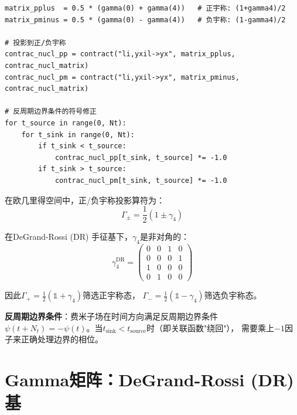 \documentclass[12pt,a4paper]{ctexart}
\begin{document}
\begin{codebox}
\begin{lstlisting}[style=pythonstyle]
matrix_pplus  = 0.5 * (gamma(0) + gamma(4))   # 正宇称: (1+gamma4)/2
matrix_pminus = 0.5 * (gamma(0) - gamma(4))   # 负宇称: (1-gamma4)/2

# 投影到正/负宇称
contrac_nucl_pp = contract("li,yxil->yx", matrix_pplus,  contrac_nucl_matrix)
contrac_nucl_pm = contract("li,yxil->yx", matrix_pminus, contrac_nucl_matrix)

# 反周期边界条件的符号修正
for t_source in range(0, Nt):
    for t_sink in range(0, Nt):
        if t_sink < t_source:
            contrac_nucl_pp[t_sink, t_source] *= -1.0
        if t_sink > t_source:
            contrac_nucl_pm[t_sink, t_source] *= -1.0
\end{lstlisting}
\end{codebox}

\begin{physbox}[宇称投影算符]
在欧几里得空间中，正/负宇称投影算符为：
\begin{equation}
    \Gamma_{\pm} = \frac{1}{2}(1 \pm \gamma_4)
    \label{eq:parity_projector}
\end{equation}

在DeGrand-Rossi (DR) 手征基下，$\gamma_4$是非对角的：
\begin{equation}
    \gamma_4^{\text{DR}} = \begin{pmatrix}
        0 & 0 & 1 & 0 \\
        0 & 0 & 0 & 1 \\
        1 & 0 & 0 & 0 \\
        0 & 1 & 0 & 0
    \end{pmatrix}
\end{equation}

因此$\Gamma_+ = \frac{1}{2}(\mathbb{1} + \gamma_4)$筛选正宇称态，
$\Gamma_- = \frac{1}{2}(\mathbb{1} - \gamma_4)$筛选负宇称态。

\textbf{反周期边界条件}：费米子场在时间方向满足反周期边界条件
$\psi(t+N_t) = -\psi(t)$。当$t_{\text{sink}} < t_{\text{source}}$时（即关联函数"绕回"），
需要乘上$-1$因子来正确处理边界的相位。
\end{physbox}

\section{Gamma矩阵：DeGrand-Rossi (DR) 基}
\end{document}
